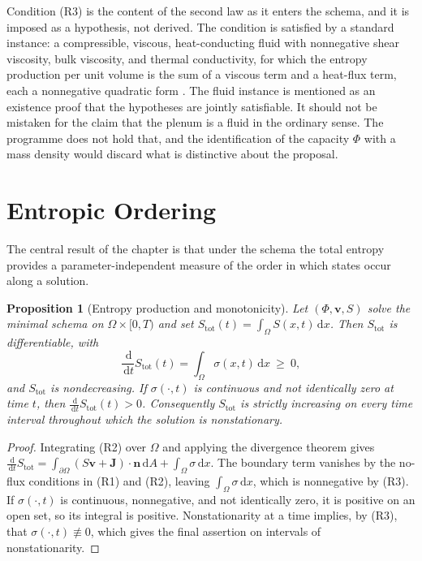 \documentclass[11pt,twoside,openright]{book}
\theoremstyle{plain}
\newtheorem{proposition}[theorem]{Proposition}
\theoremstyle{definition}
\theoremstyle{remark}
\newcommand{\dd}{\,\mathrm{d}}
\begin{document}
Condition (R3) is the content of the second law as it enters the schema, and it is imposed as a hypothesis, not derived. The condition is satisfied by a standard instance: a compressible, viscous, heat-conducting fluid with nonnegative shear viscosity, bulk viscosity, and thermal conductivity, for which the entropy production per unit volume is the sum of a viscous term and a heat-flux term, each a nonnegative quadratic form \cite{landau1987}. The fluid instance is mentioned as an existence proof that the hypotheses are jointly satisfiable. It should not be mistaken for the claim that the plenum is a fluid in the ordinary sense. The programme does not hold that, and the identification of the capacity $\Phi$ with a mass density would discard what is distinctive about the proposal.

\section{Entropic Ordering}

The central result of the chapter is that under the schema the total entropy provides a parameter-independent measure of the order in which states occur along a solution.

\begin{proposition}[Entropy production and monotonicity]\label{prop:entropy}
Let $(\Phi,\mathbf{v},S)$ solve the minimal schema on $\Omega\times[0,T)$ and set $S_{\mathrm{tot}}(t)=\int_\Omega S(x,t)\dd x$. Then $S_{\mathrm{tot}}$ is differentiable, with
\[
\frac{\dd}{\dd t}S_{\mathrm{tot}}(t)=\int_\Omega\sigma(x,t)\dd x\ \ge\ 0,
\]
and $S_{\mathrm{tot}}$ is nondecreasing. If $\sigma(\cdot,t)$ is continuous and not identically zero at time $t$, then $\frac{\dd}{\dd t}S_{\mathrm{tot}}(t)>0$. Consequently $S_{\mathrm{tot}}$ is strictly increasing on every time interval throughout which the solution is nonstationary.
\end{proposition}

\begin{proof}
Integrating (R2) over $\Omega$ and applying the divergence theorem gives $\frac{\dd}{\dd t}S_{\mathrm{tot}}=\int_{\partial\Omega}(S\mathbf{v}+\mathbf{J})\cdot\mathbf{n}\dd A+\int_\Omega\sigma\dd x$. The boundary term vanishes by the no-flux conditions in (R1) and (R2), leaving $\int_\Omega\sigma\dd x$, which is nonnegative by (R3). If $\sigma(\cdot,t)$ is continuous, nonnegative, and not identically zero, it is positive on an open set, so its integral is positive. Nonstationarity at a time implies, by (R3), that $\sigma(\cdot,t)\not\equiv0$, which gives the final assertion on intervals of nonstationarity.
\end{proof}
\end{document}
